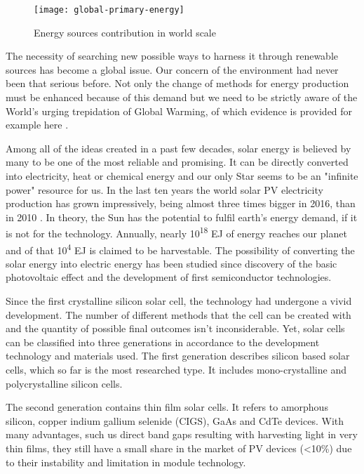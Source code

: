 \begin{figure}[H]
\centering
\texttt{[image: global-primary-energy]}
\caption{Energy sources contribution in world scale
\cite{2019}}
\label{fig:ensour}
\end{figure}

\noindent The necessity of searching new possible ways to harness it through renewable sources has become a global issue. Our concern of the environment had never been that serious before. Not only the change of methods for energy production must be enhanced because of this demand but we need to be strictly aware of the World's urging trepidation of Global Warming, of which evidence is provided for example here \cite{Nasa2019}.

\noindent Among all of the ideas created in a past few decades, solar energy is
believed by many to be one of the most reliable and promising. It can be
directly converted into electricity, heat or chemical energy and our
only Star seems to be an "infinite power" resource for us. In the last ten
years the world solar PV electricity production has grown impressively,
being almost three times bigger in 2016, than in 2010 \cite{2018}. In theory,
the Sun has the potential to fulfil earth's energy demand, if it is not
for the technology. Annually, nearly 10\textsuperscript{18} EJ of energy
reaches our planet and of that 10\textsuperscript{4} EJ is claimed to be
harvestable\cite{harv}. The possibility of converting the solar energy into
electric energy has been studied since discovery of the basic
photovoltaic effect and the development of first semiconductor technologies.

Since the first crystalline silicon solar cell, the technology had undergone a vivid development. The number of different methods that the cell can be created with and the quantity of possible final outcomes isn't inconsiderable. Yet, solar cells can be classified into three generations in accordance to the development technology and materials used\cite{HuashangRao2018}. The first generation describes silicon based solar cells, which so far is the most researched type. It includes mono-crystalline and polycrystalline silicon cells.

The second generation contains thin film solar cells. It refers to amorphous silicon, copper indium gallium selenide (CIGS), GaAs and CdTe devices. With many advantages, such us direct band gaps resulting with harvesting light in very thin films, they still have a small share in the market of PV devices (<10\%) due to their instability and limitation in module technology\cite{HuashangRao2018}.

